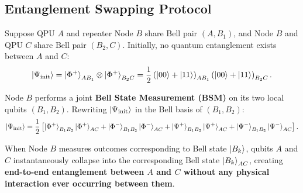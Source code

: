 \subsection{Entanglement Swapping Protocol}
Suppose QPU $A$ and repeater Node $B$ share Bell pair $(A, B_1)$, and Node $B$ and QPU $C$ share Bell pair $(B_2, C)$. Initially, no quantum entanglement exists between $A$ and $C$:
\begin{equation}
    \ket{\Psi_{\text{init}}} = \ket{\Phi^+}_{A B_1} \otimes \ket{\Phi^+}_{B_2 C} = \frac{1}{2} \left( \ket{00} + \ket{11} \right)_{A B_1} \left( \ket{00} + \ket{11} \right)_{B_2 C}.
\end{equation}

Node $B$ performs a joint \textbf{Bell State Measurement (BSM)} on its two local qubits $(B_1, B_2)$. Rewriting $\ket{\Psi_{\text{init}}}$ in the Bell basis of $(B_1, B_2)$:
\begin{equation}
    \ket{\Psi_{\text{init}}} = \frac{1}{2} \left[ \ket{\Phi^+}_{B_1 B_2}\ket{\Phi^+}_{AC} + \ket{\Phi^-}_{B_1 B_2}\ket{\Phi^-}_{AC} + \ket{\Psi^+}_{B_1 B_2}\ket{\Psi^+}_{AC} + \ket{\Psi^-}_{B_1 B_2}\ket{\Psi^-}_{AC} \right].
    \label{eq:entanglement_swapping_expansion}
\end{equation}

When Node $B$ measures outcomes corresponding to Bell state $\ket{B_k}$, qubits $A$ and $C$ instantaneously collapse into the corresponding Bell state $\ket{B_k}_{AC}$, creating \textbf{end-to-end entanglement between $A$ and $C$ without any physical interaction ever occurring between them}.

